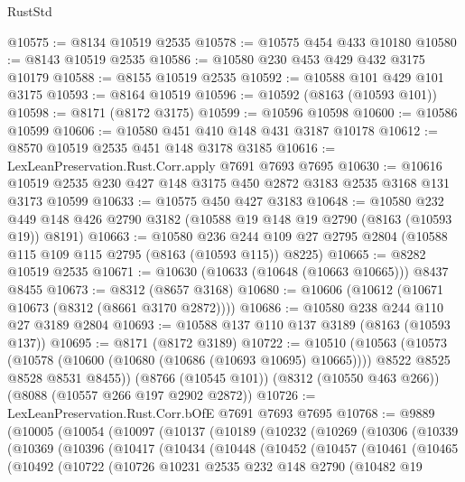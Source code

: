 \begin{lexlean}{RustStd}
\begin{coremodule}
@10575 := @8134 @10519 @2535
@10578 := @10575 @454 @433 @10180
@10580 := @8143 @10519 @2535
@10586 := @10580 @230 @453 @429 @432 @3175 @10179
@10588 := @8155 @10519 @2535
@10592 := @10588 @101 @429 @101 @3175
@10593 := @8164 @10519
@10596 := @10592 (@8163 (@10593 @101))
@10598 := @8171 (@8172 @3175)
@10599 := @10596 @10598
@10600 := @10586 @10599
@10606 := @10580 @451 @410 @148 @431 @3187 @10178
@10612 := @8570 @10519 @2535 @451 @148 @3178 @3185
@10616 := LexLeanPreservation.Rust.Corr.apply @7691 @7693 @7695
@10630 := @10616 @10519 @2535 @230 @427 @148 @3175 @450 @2872 @3183 @2535 @3168 @131 @3173 @10599
@10633 := @10575 @450 @427 @3183
@10648 := @10580
    @232
    @449
    @148
    @426
    @2790
    @3182
    (@10588 @19 @148 @19 @2790 (@8163 (@10593 @19)) @8191)
@10663 := @10580
    @236
    @244
    @109
    @27
    @2795
    @2804
    (@10588 @115 @109 @115 @2795 (@8163 (@10593 @115)) @8225)
@10665 := @8282 @10519 @2535
@10671 := @10630 (@10633 (@10648 (@10663 @10665))) @8437 @8455
@10673 := @8312 (@8657 @3168)
@10680 := @10606 (@10612 (@10671 @10673 (@8312 (@8661 @3170 @2872))))
@10686 := @10580 @238 @244 @110 @27 @3189 @2804
@10693 := @10588 @137 @110 @137 @3189 (@8163 (@10593 @137))
@10695 := @8171 (@8172 @3189)
@10722 := @10510
    (@10563
      (@10573
        (@10578 (@10600 (@10680 (@10686 (@10693 @10695) @10665))))
        @8522
        @8525
        @8528
        @8531
        @8455))
    (@8766 (@10545 @101))
    (@8312 (@10550 @463 @266))
    (@8088 (@10557 @266 @197 @2902 @2872))
@10726 := LexLeanPreservation.Rust.Corr.bOfE @7691 @7693 @7695
@10768 := @9889
    (@10005
      (@10054
        (@10097
          (@10137
            (@10189
              (@10232
                (@10269
                  (@10306
                    (@10339
                      (@10369
                        (@10396
                          (@10417
                            (@10434
                              (@10448
                                (@10452
                                  (@10457
                                    (@10461
                                      (@10465
                                        (@10492
                                          (@10722
                                            (@10726
                                              @10231
                                              @2535
                                              @232
                                              @148
                                              @2790
                                              (@10482
                                                @19

\end{coremodule}
\end{lexlean}
